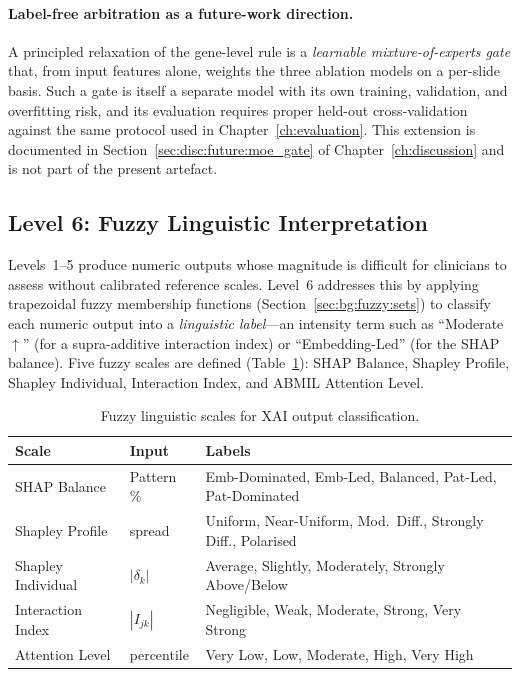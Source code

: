 \paragraph{Label-free arbitration as a future-work direction.}
A principled relaxation of the gene-level rule is a
\emph{learnable mixture-of-experts gate} that, from
input features alone, weights the three ablation models
on a per-slide basis.
Such a gate is itself a separate model with its own training,
validation, and overfitting risk, and its evaluation requires
proper held-out cross-validation against the same protocol used
in Chapter~\ref{ch:evaluation}.
This extension is documented in
Section~\ref{sec:disc:future:moe_gate} of
Chapter~\ref{ch:discussion} and is not part of the present
artefact.

\subsection{Level 6: Fuzzy Linguistic Interpretation}
\label{sec:meth:interp:fuzzy_labels}

Levels~1--5 produce numeric outputs whose magnitude is difficult for
clinicians to assess without calibrated reference scales.
Level~6 addresses this by applying trapezoidal fuzzy membership
functions (Section~\ref{sec:bg:fuzzy:sets}) to classify each numeric
output into a \emph{linguistic label}---an intensity term such as
``Moderate~$\uparrow$'' (for a supra-additive interaction index) or
``Embedding-Led'' (for the SHAP balance).
Five fuzzy scales are defined (Table~\ref{tab:fuzzy_scales}):
SHAP Balance, Shapley Profile, Shapley Individual, Interaction Index,
and ABMIL Attention Level.

\begin{table}[ht!]
\centering\small
\caption{Fuzzy linguistic scales for XAI output classification.}
\label{tab:fuzzy_scales}
\begin{tabular}{l l l}
\hline
\textbf{Scale} & \textbf{Input} & \textbf{Labels} \\
\hline
SHAP Balance & Pattern \% & Emb-Dominated, Emb-Led, Balanced, Pat-Led, Pat-Dominated \\
Shapley Profile & spread & Uniform, Near-Uniform, Mod.\ Diff., Strongly Diff., Polarised \\
Shapley Individual & $|\delta_k|$ & Average, Slightly, Moderately, Strongly Above/Below \\
Interaction Index & $|I_{jk}|$ & Negligible, Weak, Moderate, Strong, Very Strong \\
Attention Level & percentile & Very Low, Low, Moderate, High, Very High \\
\hline
\end{tabular}
\end{table}

